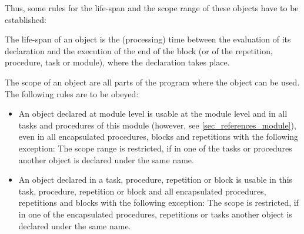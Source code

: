 Thus, some rules for the life-span and the scope range of these objects
have to be established:

The life-span of an object is the (processing) time between the
evaluation of its declaration and the execution of the end of the block
(or of the repetition, procedure, task or module), where the declaration
takes place.


The scope of an object are all parts of the program where the object can
be used. The following rules are to be obeyed:
\begin{itemize}
\item An object declared at module level is usable at the module level
and in all tasks and procedures of this module (however, see 
\ref{sec_references_module}), even
in all encapsulated procedures, blocks and repetitions with the
following exception: The scope range is restricted, if in one of the
tasks or procedures another object is declared under the same name.
\item An object declared in a task, procedure, repetition or block is
usable in this task, procedure, repetition or block and all
encapsulated procedures, repetitions and blocks with the following
exception: The scope is restricted, if in one of the encapsulated
procedures, repetitions or tasks another object is declared under the
same name.
\end{itemize}

